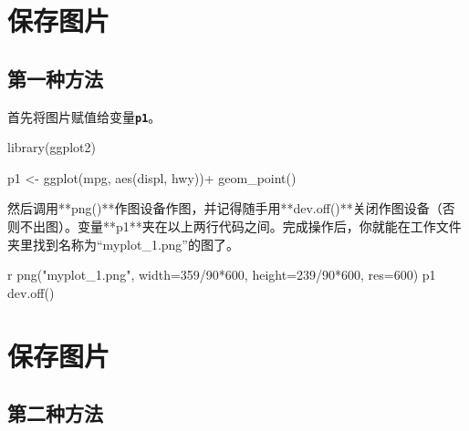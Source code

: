 \documentclass[
]{book}
\newenvironment{Shaded}{\begin{snugshade}}{\end{snugshade}}
\newcommand{\AttributeTok}[1]{\textcolor[rgb]{0.77,0.63,0.00}{#1}}
\newcommand{\FunctionTok}[1]{\textcolor[rgb]{0.00,0.00,0.00}{#1}}
\newcommand{\NormalTok}[1]{#1}
\newcommand{\OtherTok}[1]{\textcolor[rgb]{0.56,0.35,0.01}{#1}}
\newcommand{\SpecialCharTok}[1]{\textcolor[rgb]{0.00,0.00,0.00}{#1}}
\newcommand{\StringTok}[1]{\textcolor[rgb]{0.31,0.60,0.02}{#1}}
\begin{document}
\hypertarget{ux4fddux5b58ux56feux7247}{%
\section{保存图片}\label{ux4fddux5b58ux56feux7247}}

\hypertarget{ux7b2cux4e00ux79cdux65b9ux6cd5}{%
\subsection{第一种方法}\label{ux7b2cux4e00ux79cdux65b9ux6cd5}}

首先将图片赋值给变量\textbf{\texttt{p1}}。

\begin{Shaded}
\begin{Highlighting}[]
\FunctionTok{library}\NormalTok{(ggplot2)}

\NormalTok{p1 }\OtherTok{\textless{}{-}} \FunctionTok{ggplot}\NormalTok{(mpg, }\FunctionTok{aes}\NormalTok{(displ, hwy))}\SpecialCharTok{+}
  \FunctionTok{geom\_point}\NormalTok{()}


\NormalTok{然后调用}\SpecialCharTok{**}\StringTok{\textasciigrave{}}\AttributeTok{png()}\StringTok{\textasciigrave{}}\SpecialCharTok{**}\NormalTok{作图设备作图，并记得随手用}\SpecialCharTok{**}\StringTok{\textasciigrave{}}\AttributeTok{dev.off()}\StringTok{\textasciigrave{}}\SpecialCharTok{**}\NormalTok{关闭作图设备（否则不出图）。变量}\SpecialCharTok{**}\StringTok{\textasciigrave{}}\AttributeTok{p1}\StringTok{\textasciigrave{}}\SpecialCharTok{**}\NormalTok{夹在以上两行代码之间。完成操作后，你就能在工作文件夹里找到名称为“myplot\_1.png”的图了。}

\StringTok{\textasciigrave{}\textasciigrave{}\textasciigrave{}}\AttributeTok{r }
\AttributeTok{png("myplot\_1.png", width=359/90*600, height=239/90*600, res=600)}
\AttributeTok{p1}
\AttributeTok{dev.off()}
\end{Highlighting}
\end{Shaded}

\hypertarget{ux4fddux5b58ux56feux7247-1}{%
\section{保存图片}\label{ux4fddux5b58ux56feux7247-1}}

\hypertarget{ux7b2cux4e8cux79cdux65b9ux6cd5}{%
\subsection{第二种方法}\label{ux7b2cux4e8cux79cdux65b9ux6cd5}}
\end{document}
